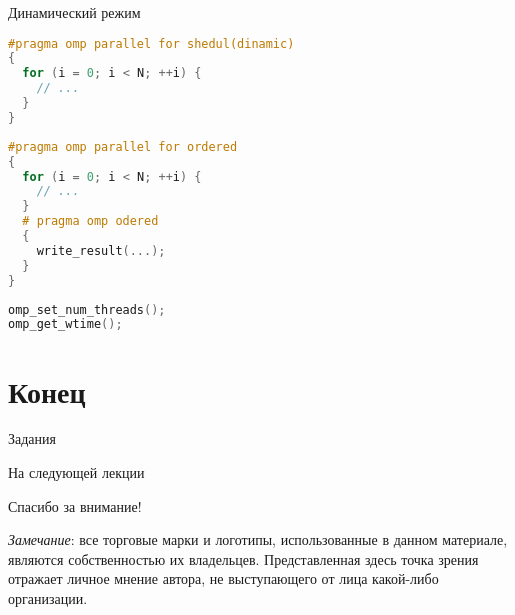 \begin{frame}[fragile]{Динамический режим}

\begin{lstlisting}[language=C++,basicstyle=\ttfamily,keywordstyle=\color{blue},basicstyle=\scriptsize]
#pragma omp parallel for shedul(dinamic)
{
  for (i = 0; i < N; ++i) {
    // ...
  }
}
\end{lstlisting}

\end{frame}

\begin{frame}[fragile]

\begin{lstlisting}[language=C++,basicstyle=\ttfamily,keywordstyle=\color{blue},basicstyle=\scriptsize]
#pragma omp parallel for ordered
{
  for (i = 0; i < N; ++i) {
    // ...
  }
  # pragma omp odered
  {
    write_result(...);
  }
}
\end{lstlisting}

\end{frame}

\begin{frame}[fragile]

\begin{lstlisting}[language=C++,basicstyle=\ttfamily,keywordstyle=\color{blue},basicstyle=\scriptsize]
omp_set_num_threads();
omp_get_wtime();
\end{lstlisting}

\end{frame}

\section{Конец}

\begin{frame}{Задания}
\end{frame}

\begin{frame}{На следующей лекции}
\end{frame}

\begin{frame}

{\huge{Спасибо за внимание!}\par}

\vfill

\tiny{\textit{Замечание}: все торговые марки и логотипы, использованные в данном материале, являются собственностью их владельцев. Представленная здесь точка зрения отражает личное мнение автора, не выступающего от лица какой-либо организации.}

\end{frame}


